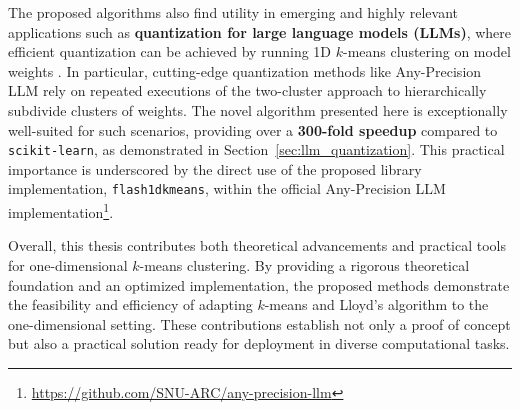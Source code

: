 The proposed algorithms also find utility in emerging and highly relevant applications such as \textbf{quantization for large language models (LLMs)}, where efficient quantization can be achieved by running 1D $k$-means clustering on model weights \cite{sqllm}. In particular, cutting-edge quantization methods like Any-Precision LLM \cite{anyprec} rely on repeated executions of the two-cluster approach to hierarchically subdivide clusters of weights. The novel algorithm presented here is exceptionally well-suited for such scenarios, providing over a \textbf{300-fold speedup} compared to \texttt{scikit-learn}, as demonstrated in Section~\ref{sec:llm_quantization}. This practical importance is underscored by the direct use of the proposed library implementation, \texttt{flash1dkmeans}, within the official Any-Precision LLM implementation\footnote{\url{https://github.com/SNU-ARC/any-precision-llm}}.

Overall, this thesis contributes both theoretical advancements and practical tools for one-dimensional $k$-means clustering. By providing a rigorous theoretical foundation and an optimized implementation, the proposed methods demonstrate the feasibility and efficiency of adapting $k$-means and Lloyd’s algorithm to the one-dimensional setting. These contributions establish not only a proof of concept but also a practical solution ready for deployment in diverse computational tasks.
